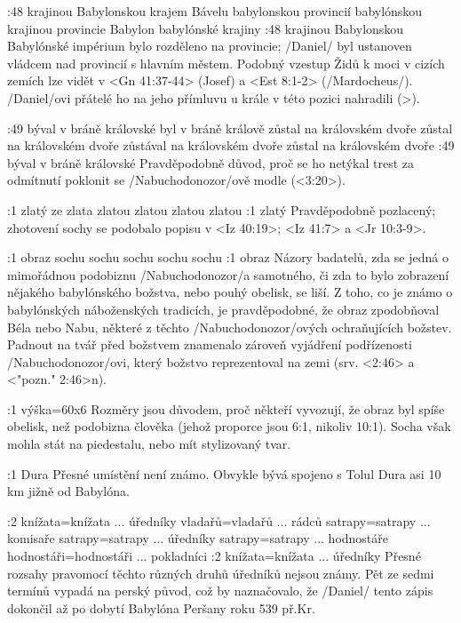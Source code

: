 :48
    {krajinou Babylonskou}  %
    {krajem Bávelu} %
    {babylonskou provincií}  %
    {babylónskou krajinou} %
    {provincie Babylon}  %
    {babylónské krajiny}  %
:48 {krajinou Babylonskou} Babylónské impérium bylo rozděleno na provincie;  \x/Daniel/ byl ustanoven vládcem nad provincií s hlavním městem. Podobný vzestup Židů k moci v cizích zemích lze vidět v <Gn 41:37-44> (Josef) a <Est 8:1-2> (\x/Mardocheus/). \x/Daniel/ovi přátelé ho na jeho přímluvu u krále v této pozici nahradili (>).

:49
    {býval v bráně královské}  %
    {byl v bráně králově} %
    {zůstal na královském dvoře}  %
    {zůstal na královském dvoře} %
    {zůstával na královském dvoře}  %
    {zůstal na královském dvoře}  %
:49 {býval v bráně královské} Pravděpodobně důvod, proč se ho netýkal trest za odmítnutí poklonit se \x/Nabuchodonozor/ově modle (<3:20>).

:1  
    {zlatý}  %
    {ze zlata} %
    {zlatou}  %
    {zlatou} %
    {zlatou}  %
    {zlatou}  %
 :1 {zlatý}  Pravděpodobně pozlacený; zhotovení sochy se podobalo popisu v <Iz 40:19>; <Iz 41:7> a  <Jr 10:3-9>.


:1  
    {obraz}  %
    {sochu} %
    {sochu}  %
    {sochu} %
    {sochu}  %
    {sochu}  %
:1 {obraz} Názory badatelů, zda se jedná o mimořádnou podobiznu  \x/Nabuchodonozor/a samotného, či zda to bylo zobrazení nějakého babylónského božstva, nebo pouhý obelisk, se liší. Z toho, co je známo o babylónských náboženských tradicích, je pravděpodobné, že obraz zpodobňoval Béla nebo Nabu, některé z těchto \x/Nabuchodonozor/ových ochraňujících božstev. Padnout na tvář před božstvem znamenalo zároveň vyjádření podřízenosti \x/Nabuchodonozor/ovi, který božstvo reprezentoval na zemi (srv. <2:46> a <"pozn." 2:46>n). 

:1 {výška}={60x6} Rozměry jsou důvodem, proč někteří vyvozují, že obraz byl spíše obelisk, než podobizna člověka (jehož proporce jsou 6:1, nikoliv 10:1). Socha však mohla stát na piedestalu, nebo mít stylizovaný tvar.

:1 {Dura} Přesné umístění není známo. Obvykle bývá spojeno s Tolul Dura asi 10 km jižně od Babylóna.

:2
    {knížata}={knížata ... úředníky}  %
    {vladařů}={vladařů ... rádců} %
    {satrapy}={satrapy ... komisaře}  %
    {satrapy}={satrapy ... úředníky} %
    {satrapy}={satrapy ... hodnostáře}  %
    {hodnostáři}={hodnostáři ... pokladníci}  %
:2 {knížata}={knížata ... úředníky} Přesné rozsahy pravomocí těchto  různých druhů úředníků nejsou známy. Pět ze sedmi termínů vypadá na perský původ, což by naznačovalo, že \x/Daniel/ tento zápis dokončil až po dobytí Babylóna Peršany  roku 539 př.Kr.

